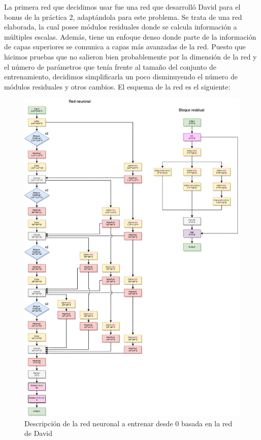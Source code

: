 \documentclass[11pt,a4paper]{article}
\theoremstyle{definition}
\begin{document}
La primera red que decidimos usar fue una red que desarrolló David para el bonus de la práctica 2, adaptándola para este problema. Se trata de una red elaborada, la cual posee módulos residuales donde se calcula información a múltiples escalas. Además,  tiene un enfoque denso donde parte de la información de capas superiores se comunica a capas más avanzadas de la red.  Puesto que hicimos pruebas que no salieron bien probablemente por la dimensión de la red y el número de parámetros que tenía frente al tamaño del conjunto de entrenamiento, decidimos simplificarla un poco disminuyendo el número de módulos residuales y otros cambios. El esquema de la red es el siguiente:

\begin{figure}[H]
  \centering
    \includegraphics[scale=0.5]{./images/ScratchDavid.png}
	\caption{Descripción de la red neuronal a entrenar desde 0 basada en la red de David}

\end{figure}
\end{document}
